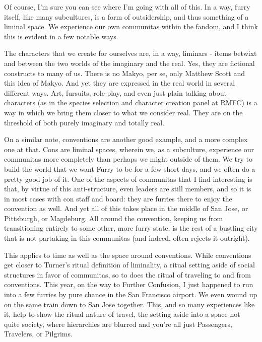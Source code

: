 Of course, I'm sure you can see where I'm going with all of this. In a way, furry itself, like many subcultures, is a form of outsidership, and thus something of a liminal space. We experience our own communitas within the fandom, and I think this is evident in a few notable ways.

The characters that we create for ourselves are, in a way, liminars - items betwixt and between the two worlds of the imaginary and the real. Yes, they are fictional constructs to many of us. There is no Makyo, per se, only Matthew Scott and this idea of Makyo. And yet they are expressed in the real world in several different ways. Art, fursuits, role-play, and even just plain talking about characters (as in the species selection and character creation panel at RMFC) is a way in which we bring them closer to what we consider real. They are on the threshold of both purely imaginary and totally real.

On a similar note, conventions are another good example, and a more complex one at that. Cons are liminal spaces, wherein we, as a subculture, experience our communitas more completely than perhaps we might outside of them. We try to build the world that we want Furry to be for a few short days, and we often do a pretty good job of it. One of the aspects of communitas that I find interesting is that, by virtue of this anti-structure, even leaders are still members, and so it is in most cases with con staff and board: they are furries there to enjoy the convention as well. And yet all of this takes place in the middle of San Jose, or Pittsburgh, or Magdeburg. All around the convention, keeping us from transitioning entirely to some other, more furry state, is the rest of a bustling city that is not partaking in this communitas (and indeed, often rejects it outright).

This applies to time as well as the space around conventions. While conventions get closer to Turner's ritual definition of liminality, a ritual setting aside of social structures in favor of communitas, so to does the ritual of traveling to and from conventions. This year, on the way to Further Confusion, I just happened to run into a few furries by pure chance in the San Francisco airport. We even wound up on the same train down to San Jose together. This, and so many experiences like it, help to show the ritual nature of travel, the setting aside into a space not quite society, where hierarchies are blurred and you're all just Passengers, Travelers, or Pilgrims.

